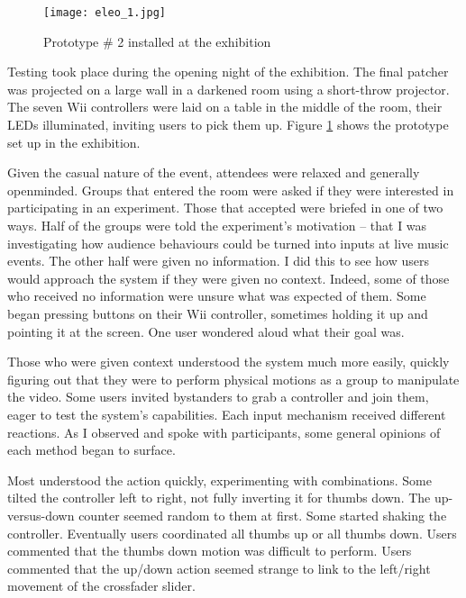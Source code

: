 \begin{figure}
	\centering

	\texttt{[image: eleo\_1.jpg]}
	\caption{Prototype \# 2 installed at the exhibition}

	\label{prototyping2.4}
\end{figure}

Testing took place during the opening night of the exhibition. The final patcher was projected on a large wall in a darkened room using a short-throw projector. The seven Wii controllers were laid on a table in the middle of the room, their LEDs illuminated, inviting users to pick them up. Figure \ref{prototyping2.4} shows the prototype set up in the exhibition.

Given the casual nature of the event, attendees were relaxed and generally openminded. Groups that entered the room were asked if they were interested in participating in an experiment. Those that accepted were briefed in one of two ways. Half of the groups were told the experiment's motivation -- that I was investigating how audience behaviours could be turned into inputs at live music events. The other half were given no information. I did this to see how users would approach the system if they were given no context. Indeed, some of those who received no information were unsure what was expected of them. Some began pressing buttons on their Wii controller, sometimes holding it up and pointing it at the screen. One user wondered aloud what their goal was.

Those who were given context understood the system much more easily, quickly figuring out that they were to perform physical motions as a group to manipulate the video. Some users invited bystanders to grab a controller and join them, eager to test the system's capabilities. Each input mechanism received different reactions. As I observed and spoke with participants, some general opinions of each method began to surface.

Most understood the action quickly, experimenting with combinations. Some tilted the controller left to right, not fully inverting it for thumbs down. The up-versus-down counter seemed random to them at first. Some started shaking the controller. Eventually users coordinated all thumbs up or all thumbs down. Users commented that the thumbs down motion was difficult to perform. Users commented that the up/down action seemed strange to link to the left/right movement of the crossfader slider.

